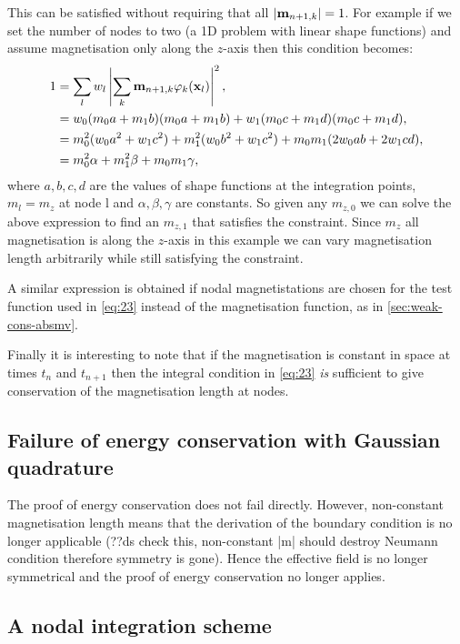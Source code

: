 This can be satisfied without requiring that all $\left|{\mathbf{m}_{n+1, k}} \right| = 1$.
For example if we set the number of nodes to two (a 1D problem with linear shape functions) and assume magnetisation only along the $z$-axis then this condition becomes:
\begin{equation}
  \begin{aligned}
    1 &= \sum_l w_l \left|{\sum_k \mathbf{m}_{n+1, k} \varphi_k(\mathbf{x}_l)} \right|^2, \\
    &= w_0 (m_0 a + m_1 b)(m_0 a + m_1 b) + w_1 (m_0 c + m_1 d)(m_0 c + m_1 d), \\
    &= m_0^2 (w_0 a^2 + w_1 c^2) + m_1^2 (w_0 b^2 + w_1 c^2) + m_0 m_1 (2w_0ab + 2w_1cd), \\
    &= m_0^2 \alpha + m_1^2 \beta + m_0 m_1 \gamma, \\
  \end{aligned}
\end{equation}
where $a,b,c,d$ are the values of shape functions at the integration points, $m_l = m_{z}$ at node l and $\alpha, \beta, \gamma$ are constants.
So given any $m_{z,0}$ we can solve the above expression to find an $m_{z,1}$ that satisfies the constraint.
Since $m_z$ all magnetisation is along the $z$-axis in this example we can vary magnetisation length arbitrarily while still satisfying the constraint.

A similar expression is obtained if nodal magnetistations are chosen for the test function used in \eqref{eq:23} instead of the magnetisation function, as in \autoref{sec:weak-cons-absmv}.

Finally it is interesting to note that if the magnetisation is constant in space at times $t_n$ and $t_{n+1}$ then the integral condition in \eqref{eq:23} \emph{is} sufficient to give conservation of the magnetisation length at nodes.


\subsection{Failure of energy conservation with Gaussian quadrature}

The proof of energy conservation does not fail directly.
However, non-constant magnetisation length means that the derivation of the boundary condition is no longer applicable (??ds check this, non-constant |m| should destroy Neumann condition therefore symmetry is gone).
Hence the effective field is no longer symmetrical and the proof of energy conservation no longer applies.

\subsection{A nodal integration scheme}

